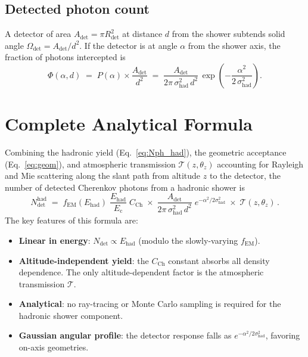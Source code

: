 \documentclass[11pt]{article}
\newcommand{\Ec}{E_{\mathrm{c}}}
\newcommand{\Ehad}{E_{\mathrm{had}}}
\newcommand{\fEM}{f_{\mathrm{EM}}}
\newcommand{\CCH}{C_{\mathrm{Ch}}}
\newcommand{\Adet}{A_{\mathrm{det}}}
\newcommand{\Rdet}{R_{\mathrm{det}}}
\newcommand{\shad}{\sigma_{\mathrm{had}}}
\begin{document}
\subsection{Detected photon count}

A detector of area $\Adet = \pi\Rdet^2$ at distance $d$ from the
shower subtends solid angle $\Omega_{\mathrm{det}} = \Adet / d^2$.  If
the detector is at angle $\alpha$ from the shower axis, the fraction of
photons intercepted is
\begin{equation}
  \Phi(\alpha, d)
  \;=\;
  P(\alpha) \times \frac{\Adet}{d^2}
  \;=\;
  \frac{\Adet}{2\pi\,\shad^2\,d^2}\,
  \exp\!\left(-\frac{\alpha^2}{2\,\shad^2}\right).
  \label{eq:geom}
\end{equation}

\section{Complete Analytical Formula}
\label{sec:formula}

Combining the hadronic yield (Eq.~\ref{eq:Nph_had}), the geometric
acceptance (Eq.~\ref{eq:geom}), and atmospheric transmission $\mathcal{T}(z,\theta_z)$
accounting for Rayleigh and Mie scattering along the slant path from
altitude $z$ to the detector, the number of detected Cherenkov photons
from a hadronic shower is
\begin{equation}
  \boxed{
  N_{\mathrm{det}}^{\mathrm{had}}
  \;=\;
  \fEM(\Ehad)\;\frac{\Ehad}{\Ec}\;\CCH
  \;\times\;
  \frac{\Adet}{2\pi\,\shad^2\,d^2}\;
  e^{-\alpha^2/2\shad^2}
  \;\times\;
  \mathcal{T}(z, \theta_z)\,.
  }
  \label{eq:master}
\end{equation}
The key features of this formula are:
\begin{itemize}[nosep]
  \item \textbf{Linear in energy}: $N_{\mathrm{det}} \propto \Ehad$
    (modulo the slowly-varying $\fEM$).
  \item \textbf{Altitude-independent yield}: the $\CCH$ constant
    absorbs all density dependence. The only altitude-dependent factor
    is the atmospheric transmission $\mathcal{T}$.
  \item \textbf{Analytical}: no ray-tracing or Monte Carlo sampling
    is required for the hadronic shower component.
  \item \textbf{Gaussian angular profile}: the detector response falls
    as $e^{-\alpha^2/2\shad^2}$, favoring on-axis geometries.
\end{itemize}
\end{document}
